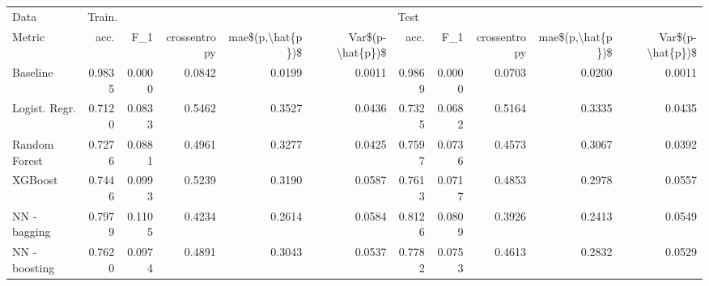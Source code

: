 \begin{tabular}{lrrrrrrrrrr}
\toprule
Data & \multicolumn{5}{l}{Train.} & \multicolumn{5}{l}{Test} \\
Metric &    acc. &     F\_1 & crossentropy & mae\$(p,\textbackslash hat\{p\})\$ & Var\$(p-\textbackslash hat\{p\})\$ &    acc. &     F\_1 & crossentropy & mae\$(p,\textbackslash hat\{p\})\$ & Var\$(p-\textbackslash hat\{p\})\$ \\
\midrule
Baseline      &  0.9835 &  0.0000 &       0.0842 &           0.0199 &           0.0011 &  0.9869 &  0.0000 &       0.0703 &           0.0200 &           0.0011 \\
Logist. Regr. &  0.7120 &  0.0833 &       0.5462 &           0.3527 &           0.0436 &  0.7325 &  0.0682 &       0.5164 &           0.3335 &           0.0435 \\
Random Forest &  0.7276 &  0.0881 &       0.4961 &           0.3277 &           0.0425 &  0.7597 &  0.0736 &       0.4573 &           0.3067 &           0.0392 \\
XGBoost       &  0.7446 &  0.0993 &       0.5239 &           0.3190 &           0.0587 &  0.7613 &  0.0717 &       0.4853 &           0.2978 &           0.0557 \\
NN - bagging  &  0.7979 &  0.1105 &       0.4234 &           0.2614 &           0.0584 &  0.8126 &  0.0809 &       0.3926 &           0.2413 &           0.0549 \\
NN - boosting &  0.7620 &  0.0974 &       0.4891 &           0.3043 &           0.0537 &  0.7782 &  0.0753 &       0.4613 &           0.2832 &           0.0529 \\
\bottomrule
\end{tabular}
